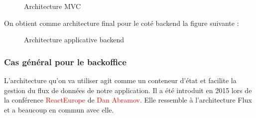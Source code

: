 \begin{figure}[H]
	\caption{\label{fig:my-label} Architecture MVC}
\end{figure}

On obtient comme architecture final pour le cot\'e backend la figure suivante :


\begin{figure}[H]
	\caption{\label{fig:my-label} Architecture applicative backend}
\end{figure}

\subsubsection{Cas g\'en\'eral pour le backoffice}

L'architecture qu'on va utiliser agit comme un conteneur d'\'etat et facilite la gestion du flux de donn\'ees de notre application. Il a \'et\'e introduit en 2015 lors de la conf\'erence \textcolor{red}{ReactEurope} de \textcolor{red}{Dan Abramov}. Elle ressemble \`a l'architecture Flux et a beaucoup en commun avec elle.

